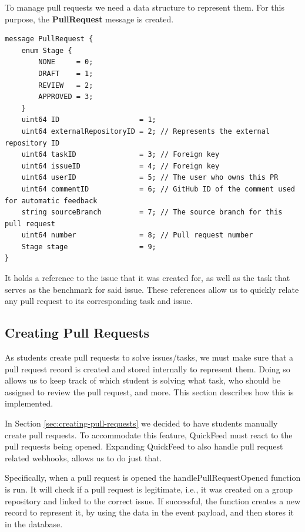 To manage pull requests we need a data structure to represent them.
For this purpose, the \textbf{PullRequest} message is created.

\begin{lstlisting}[caption={PullRequest message}]
message PullRequest {
    enum Stage {
        NONE     = 0;
        DRAFT    = 1;
        REVIEW   = 2;
        APPROVED = 3;
    }
    uint64 ID                   = 1;
    uint64 externalRepositoryID = 2; // Represents the external repository ID
    uint64 taskID               = 3; // Foreign key
    uint64 issueID              = 4; // Foreign key
    uint64 userID               = 5; // The user who owns this PR
    uint64 commentID            = 6; // GitHub ID of the comment used for automatic feedback
    string sourceBranch         = 7; // The source branch for this pull request
    uint64 number               = 8; // Pull request number
    Stage stage                 = 9;
}
\end{lstlisting}

It holds a reference to the issue that it was created for, as well as the task that serves as the benchmark for said issue.
These references allow us to quickly relate any pull request to its corresponding task and issue.

\subsection{Creating Pull Requests}

As students create pull requests to solve issues/tasks, we must make sure that a pull request record is created and stored internally to represent them.
Doing so allows us to keep track of which student is solving what task, who should be assigned to review the pull request, and more.
This section describes how this is implemented.

In Section \ref{sec:creating-pull-requests} we decided to have students manually create pull requests.
To accommodate this feature, QuickFeed must react to the pull requests being opened.
Expanding QuickFeed to also handle pull request related webhooks, allows us to do just that.

Specifically, when a pull request is opened the handlePullRequestOpened function is run.
It will check if a pull request is legitimate, i.e., it was created on a group repository and linked to the correct issue.
If successful, the function creates a new record to represent it, by using the data in the event payload, and then stores it in the database.

